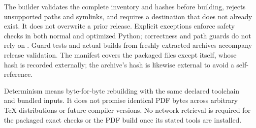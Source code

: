 \documentclass[11pt,letterpaper]{article}
\numberwithin{equation}{section}
\theoremstyle{definition}\newtheorem{definition}[theorem]{Definition}
\theoremstyle{remark}\newtheorem{remark}[theorem]{Remark}
\newcommand{\code}[1]{\texttt{\detokenize{#1}}}
\begin{document}
The builder validates the complete inventory and hashes before building, rejects unsupported paths and symlinks, and requires a destination that does not already exist. It does not overwrite a prior release. Explicit exceptions enforce safety checks in both normal and optimized Python; correctness and path guards do not rely on \code{assert}. Guard tests and actual builds from freshly extracted archives accompany release validation. The manifest covers the packaged files except itself, whose hash is recorded externally; the archive's hash is likewise external to avoid a self-reference.

Determinism means byte-for-byte rebuilding with the same declared toolchain and bundled inputs. It does not promise identical PDF bytes across arbitrary TeX distributions or future compiler versions. No network retrieval is required for the packaged exact checks or the PDF build once its stated tools are installed.
\end{document}
